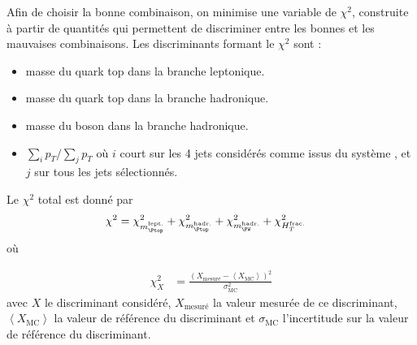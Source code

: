 \medskip

Afin de choisir la bonne combinaison, on minimise une variable de $\chi^2$, construite à partir de quantités qui permettent de discriminer entre les bonnes et les mauvaises combinaisons. Les discriminants formant le $\chi^2$ sont :
\begin{itemize}
    \item masse du quark top dans la branche leptonique.
    \item masse du quark top dans la branche hadronique.
    \item masse du boson \PW dans la branche hadronique.
    \item $\sum\limits_i{p_T} / \sum\limits_j{p_T}$ où $i$ court sur les 4 jets considérés comme issus du système \ttbar, et $j$ sur tous les jets sélectionnés.
\end{itemize}

Le $\chi^2$ total est donné par
\begin{align} \label{eq:chi2}
  \chi^2 &= \chi^2_{m_{\Ptop}^{\text{lept.}}} + \chi^2_{m_{\Ptop}^{\text{hadr.}}} + \chi^2_{m_{\PW}^{\text{hadr.}}} + \chi^2_{H_{T}^{\text{frac.}}}
\end{align}
où

\begin{align*}
  \chi^2_X &= \frac{\left( X_\text{mesuré} - \left\langle X_\text{MC} \right\rangle \right)^2}{\sigma_\text{MC}^2}
\end{align*}
avec $X$ le discriminant considéré, $X_\text{mesuré}$ la valeur mesurée de ce discriminant, $\left\langle X_\text{MC} \right\rangle$ la valeur de référence du discriminant et $\sigma_\text{MC}$ l'incertitude sur la valeur de référence du discriminant.

